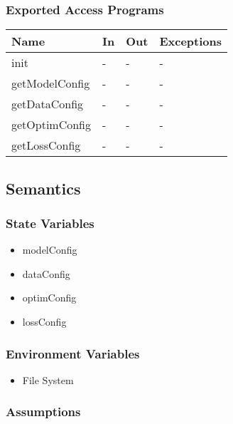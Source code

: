 \documentclass[12pt, titlepage]{article}
\begin{document}
\subsubsection{Exported Access Programs}

\begin{center}
\begin{tabular}{p{2cm}|p{6cm}|p{4cm}|p{2cm}}
\hline
\textbf{Name} & \textbf{In} & \textbf{Out} & \textbf{Exceptions} \\
\hline
init & - & - & - \\
\hline
getModelConfig & - & - & - \\
\hline
getDataConfig & - & - & - \\
\hline
getOptimConfig & - & - & - \\
\hline
getLossConfig & - & - & - \\
\hline
\end{tabular}
\end{center}

\subsection{Semantics}

\subsubsection{State Variables}

\begin{itemize}
  \item modelConfig
  \item dataConfig 
  \item optimConfig 
  \item lossConfig
\end{itemize}

\subsubsection{Environment Variables}

\begin{itemize}
  \item File System
\end{itemize}

\subsubsection{Assumptions}
\end{document}
